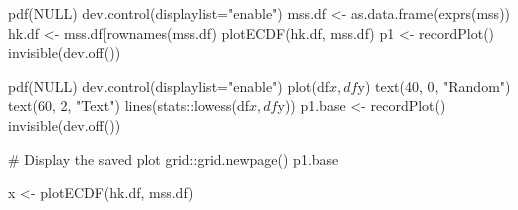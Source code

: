 \documentclass[a4paper]{article}
\begin{document}
\title{}
\author{}

\maketitle



pdf(NULL)
dev.control(displaylist="enable")
mss.df <- as.data.frame(exprs(mss))
hk.df <- mss.df[rownames(mss.df) %
plotECDF(hk.df, mss.df)
p1 <- recordPlot()
invisible(dev.off())

pdf(NULL)
dev.control(displaylist="enable")
plot(df$x, df$y)
text(40, 0, "Random")
text(60, 2, "Text")
lines(stats::lowess(df$x, df$y))
p1.base <- recordPlot()
invisible(dev.off())

# Display the saved plot
grid::grid.newpage()
p1.base

x <- plotECDF(hk.df, mss.df)





\end{document}

